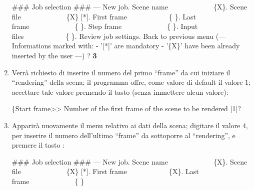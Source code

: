 \begin{enumerate}
\begin{mgCodeBox}
\small
\#\#\# Job selection \#\#\#\newline
--- New job. Scene name\ \ \ \ \ \ \ \ \ \ \ \ \ \{X\}. Scene file\ \ \ \ \ \ \ \ \ \ \ \ \ \{X\} [*]. First frame\ \ \ \ \ \ \ \ \ \ \ \ \{ \}. Last frame\ \ \ \ \ \ \ \ \ \ \ \ \ \{ \}. Step frame\ \ \ \ \ \ \ \ \ \ \ \ \ \{ \}. Input files\ \ \ \ \ \ \ \ \ \ \ \ \{ \}. Review job settings. Back to previous menu\newline
(---\newline
 Informations marked with:\newline
 - '[*]' are mandatory\newline
 - '\{X\}' have been already inserted by the user\newline
---)\newline
? \textbf{3}
\end{mgCodeBox}
\item \label{lbl:exec-array3-startframe2-useless} Verr\`a richiesto di inserire il numero del primo ``frame'' da cui iniziare il ``rendering'' della scena; il programma offre, come valore di default il valore $1$; accettare tale valore premendo il tasto  (senza immettere alcun valore):
\begin{mgCodeBox}
\small
\{Start frame>> Number of the first frame of the scene to be rendered [1]?
\end{mgCodeBox}
\item Apparir\`a nuovamente il menu relativo ai dati della scena; digitare il valore $4$, per inserire il numero dell'ultimo ``frame'' da sottoporre al ``rendering'', e premere il tasto :
\begin{mgCodeBox}
\small
\#\#\# Job selection \#\#\#\newline
--- New job. Scene name\ \ \ \ \ \ \ \ \ \ \ \ \ \{X\}. Scene file\ \ \ \ \ \ \ \ \ \ \ \ \ \{X\} [*]. First frame\ \ \ \ \ \ \ \ \ \ \ \ \{X\}. Last frame\ \ \ \ \ \ \ \ \ \ \ \ \ \{ \}\newline

\end{mgCodeBox}
\end{enumerate}
